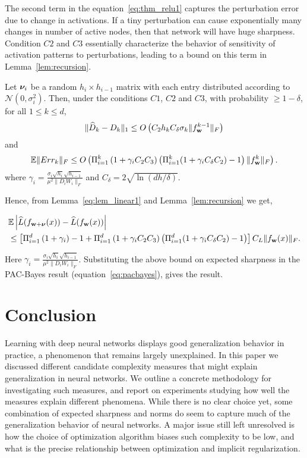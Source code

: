 \documentclass{article}
\begin{document}
The second term in the equation~\eqref{eq:thm_relu1} captures the perturbation error due to change in activations. If a tiny perturbation can cause exponentially many changes in number of active nodes, then that network will have huge sharpness. Condition $C2$ and $C3$ essentially characterize the behavior of sensitivity of activation patterns to perturbations, leading to a bound on this term in Lemma~\ref{lem:recursion}.

\begin{lem} \label{lem:recursion}
Let $\boldsymbol{\nu}_i$ be a random $h_i \times h_{i-1}$ matrix with each entry distributed according to $\mathcal{N}(0,\sigma_i^2)$. Then, under the conditions $C1$, $C2$ and $C3$, with probability $\geq 1-\delta$, for all $ 1 \leq k \leq d$, 
$$\|\widehat{D}_{k} -D_{k}\|_1 \leq  O \left( C_2 h_k  C_{\delta} \sigma_k  \|f^{k-1}_{\mathbf{w}}\|_F \right) $$ and 
$$\mathbb{E}\| Err_k\|_F \leq  O \left( \Pi_{i=1}^k \left( 1+\gamma_iC_2 C_3\right)\left(\Pi_{i=1}^k (1+ \gamma_i C_{\delta} C_2) - 1\right)\|f^k_{\mathbf{w}}\|_F \right).$$
where $\gamma_i = \frac{\sigma_i \sqrt{h_i} \sqrt{h_{i-1}}}{\mu^2 \|D_iW_i\|_F}$ and $C_\delta=2\sqrt{\ln(dh/\delta)}$.
\end{lem}

Hence, from Lemma~\ref{eq:lem_linear1} and Lemma~\ref{lem:recursion} we get, 
\begin{small}
\begin{align*}
&\mathbb{E} \left\lvert{ \widehat{L}(f_{\mathbf{w}+\boldsymbol{\nu}}(x)) -\widehat{L}(f_{\mathbf{w}}(x))}\right\rvert \nonumber \\ 
&\leq \left[\Pi_{i=1}^d \left(1+ \gamma_i \right) -1  + \Pi_{i=1}^d \left( 1+\gamma_i C_2 C_3 \right)\left(\Pi_{i=1}^d (1+ \gamma_i C_{\delta} C_2  )- 1\right) \right] C_{L} \|f_{\mathbf{w}}(x)\|_F.
\end{align*}

Here $\gamma_i =\frac{\sigma_i\sqrt{h_i}\sqrt{h_{i-1}} }{\mu^2 \|D_iW_i\|_F } $. Substituting the above bound on expected sharpness in the PAC-Bayes result (equation~\eqref{eq:pacbayes}), gives the result.
\end{small}
 
\section{Conclusion}
Learning with deep neural networks displays good generalization
behavior in practice, a phenomenon that remains largely unexplained.
In this paper we discussed different candidate complexity measures
that might explain generalization in neural networks.  We outline a
concrete methodology for investigating such measures, and report on
experiments studying how well the measures explain different
phenomena.  While there is no clear choice yet, some combination of
expected sharpness and norms do seem to capture much of the
generalization behavior of neural networks.  A major issue still left
unresolved is how the choice of optimization algorithm biases such
complexity to be low, and what is the precise relationship between
optimization and implicit regularization.
\end{document}
